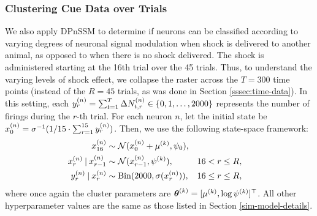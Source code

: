 \documentclass[twoside]{article}
\begin{document}
\subsubsection{Clustering Cue Data over Trials} \label{cue-cluster}%
We also apply DPnSSM to determine if neurons can be classified according to varying degrees of neuronal signal modulation when shock is delivered to another animal, as opposed to when there is no shock delivered. The shock is administered starting at the 16th trial over the 45 trials. Thus, to understand the varying levels of shock effect, we collapse the raster across the $T = 300$ time points (instead of the $R = 45$ trials, as was done in Section \ref{sssec:time-data}). In this setting, each $\idx[r] y n = \sum_{t=1}^T \Delta \idx[t, r] N n \in \{0, 1, \ldots, 2000\}$ represents the number of firings during the $r$-th trial.  For each neuron $n$, let the initial state be $\idx[0] x n = \sigma^{-1}(1 / 15 \cdot \sum_{r=1}^{15} \idx[r] y n)$.  Then, we use the following state-space framework: 
\begin{align}
\idx[16] x n &\sim \Norm(\idx[0] x n + \idx \mu k, \psi_0),\\
\idx[r] x n \given \idx[r-1] x n &\sim \Norm(\idx[r-1] x n, \idx \psi k), & & 16 < r \leq R , \nonumber \\
\idx[r] y n \given \idx[r] x n &\sim \text{Bin}(2000, \sigma(\idx[r] x n)), & & 16 \leq r \leq R, \nonumber
\end{align} 
where once again the cluster parameters are $\bidx \theta k = [\idx \mu k, \log \idx \psi k]^\top$.  All other hyperparameter values are the same as those listed in Section \ref{sim-model-details}.  
\end{document}
